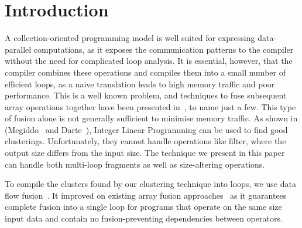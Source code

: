 \section{Introduction}
\label{s:Introduction}
A collection-oriented programming model is well suited for expressing data-parallel computations, as it exposes the communication patterns to the compiler without the need for complicated loop analysis.
It is essential, however, that the compiler combines these operations and compiles them into a small number of efficient loops, as a naive translation leads to high memory traffic and poor performance.
This is a well known problem, and techniques to fuse subsequent array operations together have been presented in~\cite{gill1993short, coutts2007streamfusion, keller2010repa}, to name just a few.
This type of fusion alone is not generally sufficient to minimise memory traffic.
As shown in (Megiddo~\cite{megiddo1998optimal} and Darte~\cite{darte2002contraction}), Integer Linear Programming can be used to find good clusterings.
Unfortunately, they cannot handle operations like filter, where the output size differs from the input size.
The technique we present in this paper can handle both multi-loop fragments as well as size-altering operations. 

To compile the clusters found by our clustering technique into loops, we use data flow fusion~\cite{lippmeier2013flow}.
It improved on existing array fusion approaches~\cite{coutts2007streamfusion, keller2010repa} as it guarantees complete fusion into a single loop for programs that operate on the same size input data and contain no fusion-preventing dependencies between operators. 



